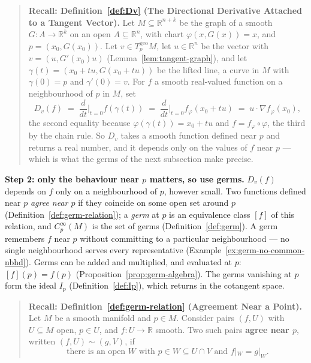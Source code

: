 \documentclass[11pt]{report}
\newcommand{\geo}{\mathrm{geo}}
\begin{document}
\begin{quote}
\textbf{Recall: Definition~\ref{def:Dv} (The Directional Derivative Attached to a Tangent Vector).} Let $M \subseteq \mathbb{R}^{n+k}$ be the graph of a smooth $G : A \to \mathbb{R}^k$ on an open $A \subseteq \mathbb{R}^n$, with chart $\varphi(x, G(x)) = x$, and $p = (x_0, G(x_0))$. Let $v \in T^{\geo}_pM$, let $u \in \mathbb{R}^n$ be the vector with $v = (u, G'(x_0)u)$ (Lemma~\ref{lem:tangent-graph}), and let $\gamma(t) = (x_0 + tu, G(x_0 + tu))$ be the lifted line, a curve in $M$ with $\gamma(0) = p$ and $\gamma'(0) = v$. For $f$ a smooth real-valued function on a neighbourhood of $p$ in $M$, set
\[
D_v(f) \;=\; \frac{d}{dt}\Big|_{t=0} f(\gamma(t)) \;=\; \frac{d}{dt}\Big|_{t=0} f_\varphi(x_0 + tu) \;=\; u \cdot \nabla f_\varphi(x_0),
\]
the second equality because $\varphi(\gamma(t)) = x_0 + tu$ and $f = f_\varphi \circ \varphi$, the third by the chain rule. So $D_v$ takes a smooth function defined near $p$ and returns a real number, and it depends only on the values of $f$ near $p$ --- which is what the germs of the next subsection make precise.
\end{quote}

\textbf{Step 2: only the behaviour near $p$ matters, so use germs.} $D_v(f)$ depends on $f$ only on a neighbourhood of $p$, however small. Two functions defined near $p$ \emph{agree near $p$} if they coincide on some open set around $p$ (Definition~\ref{def:germ-relation}); a \emph{germ} at $p$ is an equivalence class $[f]$ of this relation, and $C^\infty_p(M)$ is the set of germs (Definition~\ref{def:germ}). A germ remembers $f$ near $p$ without committing to a particular neighbourhood --- no single neighbourhood serves every representative (Example~\ref{ex:germ-no-common-nbhd}). Germs can be added and multiplied, and evaluated at $p$: $[f](p) = f(p)$ (Proposition~\ref{prop:germ-algebra}). The germs vanishing at $p$ form the ideal $I_p$ (Definition~\ref{def:Ip}), which returns in the cotangent space.

\begin{quote}
\textbf{Recall: Definition~\ref{def:germ-relation} (Agreement Near a Point).} Let $M$ be a smooth manifold and $p \in M$. Consider pairs $(f, U)$ with $U \subseteq M$ open, $p \in U$, and $f : U \to \mathbb{R}$ smooth. Two such pairs \textbf{agree near $p$}, written $(f,U) \sim (g,V)$, if
\[
\text{there is an open } W \text{ with } p \in W \subseteq U \cap V \text{ and } f|_W = g|_W .
\]
\end{quote}
\end{document}
